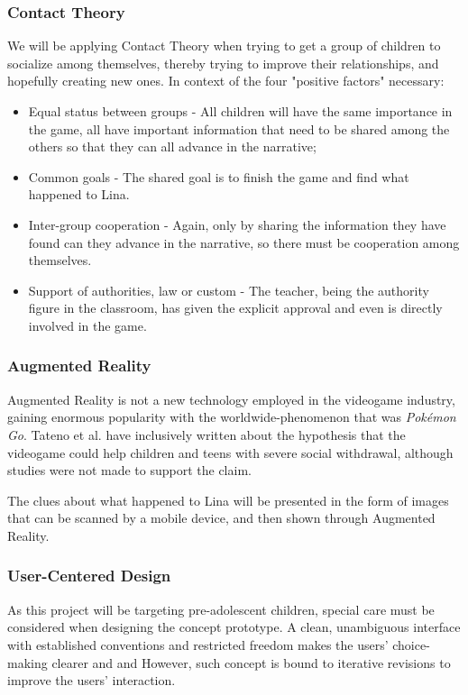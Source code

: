 \documentclass[runningheads]{llncs}
\begin{document}
\subsubsection{Contact Theory}
\par We will be applying Contact Theory when trying to get a group of children to socialize among themselves, thereby trying to improve their relationships, and hopefully creating new ones. In context of the four "positive factors" necessary:
\begin{itemize}
    \item Equal status between groups - All children will have the same importance in the game, all have important information that need to be shared among the others so that they can all advance in the narrative;
    \item Common goals - The shared goal is to finish the game and find what happened to Lina.
    \item Inter-group cooperation - Again, only by sharing the information they have found can they advance in the narrative, so there must be cooperation among themselves.
    \item Support of authorities, law or custom - The teacher, being the authority figure in the classroom, has given the explicit approval and even is directly involved in the game.
\end{itemize}

\subsubsection{Augmented Reality}
\par Augmented Reality is not a new technology employed in the videogame industry, gaining enormous popularity with the worldwide-phenomenon that was \textit{Pokémon Go}. Tateno et al. have inclusively written about the hypothesis that the videogame could help children and teens with severe social withdrawal, although studies were not made to support the claim.
\par The clues about what happened to Lina will be presented in the form of images that can be scanned by a mobile device, and then shown through Augmented Reality.  

\subsubsection{User-Centered Design}
\par As this project will be targeting pre-adolescent children, special care must be considered when designing the concept prototype. A clean, unambiguous interface with established conventions and restricted freedom makes the users' choice-making clearer and and  However, such concept is bound to iterative revisions to improve the users' interaction.
\end{document}
